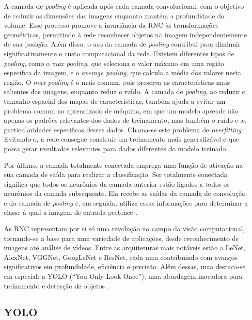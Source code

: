 A camada de \textit{pooling} é aplicada após cada camada convolucional, com o objetivo de reduzir as dimensões das imagens enquanto mantém a profundidade do volume. Esse processo promove a invariância da RNC às transformações geométricas, permitindo à rede reconhecer objetos na imagem independentemente de sua posição. Além disso, o uso da camada de \textit{pooling} contribui para diminuir significativamente o custo computacional da rede. Existem diferentes tipos de \textit{pooling}, como o \textit{max pooling}, que seleciona o valor máximo em uma região específica da imagem, e o \textit{average pooling}, que calcula a média dos valores nesta região. O \textit{max pooling} é o mais comum, pois preserva as características mais salientes das imagens, enquanto reduz o ruído. A camada de \textit{pooling}, ao reduzir o tamanho espacial dos mapas de características, também ajuda a evitar um problema comum no aprendizado de máquina, em que um modelo aprende não apenas os padrões relevantes dos dados de treinamento, mas também o ruído e as particularidades específicas desses dados. Chama-se este problema de \textit{overfitting}. Evitando-o, a rede consegue construir um treinamento mais generalizável e que possa gerar resultados relevantes para dados diferentes do modelo treinado \cite{lima2020captcha}.

Por último, a camada totalmente conectada emprega uma função de ativação na sua camada de saída para realizar a classificação. Ser totalmente conectada significa que todos os neurônios da camada anterior estão ligados a todos os neurônios da camada subsequente. Ela recebe as saídas da camada de convolução e da camada de \textit{pooling} e, em seguida, utiliza essas informações para determinar a classe à qual a imagem de entrada pertence \cite{silva2018estudo}.

As RNC representam por si só uma revolução no campo da visão computacional, tornando-se a base para uma variedade de aplicações, desde reconhecimento de imagens até análise de vídeos. Entre as arquiteturas mais notáveis estão a LeNet, AlexNet, VGGNet, GoogLeNet e ResNet, cada uma contribuindo com avanços significativos em profundidade, eficiência e precisão. Além dessas, uma destaca-se em especial: a YOLO (“You Only Look Once”), uma abordagem inovadora para treinamento e detecção de objetos \cite{carboni2021sistema}.

\subsection{YOLO}
\label{sec:yolo}

